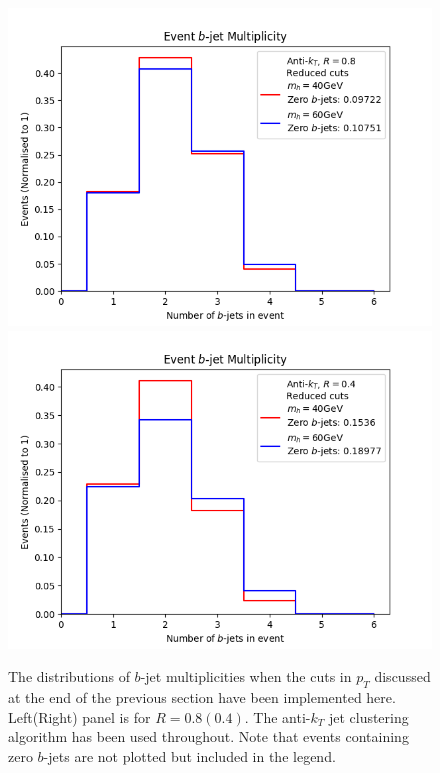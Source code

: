 \documentclass[12pt]{article}
\begin{document}
\begin{figure}[t!]
	\includegraphics[scale=0.45]{plots/nbjets_AK8_lowptcut.png}
	\includegraphics[scale=0.45]{plots/nbjets_AK4_lowptcut.png}\\
	\caption{The distributions of $b$-jet multiplicities when the cuts in $p_T$ discussed at the end of the previous section have been implemented here.
Left(Right) panel is for $R = 0.8(0.4)$.
The anti-$k_T$ jet clustering algorithm has been used throughout. Note that events containing zero $b$-jets are not plotted but included in the legend.}
\label{fig:nbjet_ptcut}
\end{figure}
\end{document}

